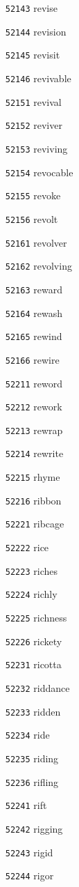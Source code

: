 \documentclass[twoside,11pt]{article}
\begin{document}
\begin{multicols}{5}
\begin{enumerate}
\item[\texttt{52143}] revise
\item[\texttt{52144}] revision
\item[\texttt{52145}] revisit
\item[\texttt{52146}] revivable
\item[\texttt{52151}] revival
\item[\texttt{52152}] reviver
\item[\texttt{52153}] reviving
\item[\texttt{52154}] revocable
\item[\texttt{52155}] revoke
\item[\texttt{52156}] revolt
\item[\texttt{52161}] revolver
\item[\texttt{52162}] revolving
\item[\texttt{52163}] reward
\item[\texttt{52164}] rewash
\item[\texttt{52165}] rewind
\item[\texttt{52166}] rewire
\item[\texttt{52211}] reword
\item[\texttt{52212}] rework
\item[\texttt{52213}] rewrap
\item[\texttt{52214}] rewrite
\item[\texttt{52215}] rhyme
\item[\texttt{52216}] ribbon
\item[\texttt{52221}] ribcage
\item[\texttt{52222}] rice
\item[\texttt{52223}] riches
\item[\texttt{52224}] richly
\item[\texttt{52225}] richness
\item[\texttt{52226}] rickety
\item[\texttt{52231}] ricotta
\item[\texttt{52232}] riddance
\item[\texttt{52233}] ridden
\item[\texttt{52234}] ride
\item[\texttt{52235}] riding
\item[\texttt{52236}] rifling
\item[\texttt{52241}] rift
\item[\texttt{52242}] rigging
\item[\texttt{52243}] rigid
\item[\texttt{52244}] rigor

\end{enumerate}
\end{multicols}
\end{document}
